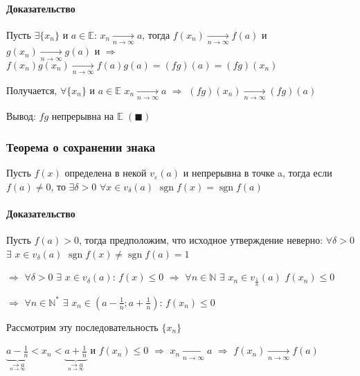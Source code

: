 \documentclass[class=article,a4paper,12pt,crop=false]{standalone}
\DeclareMathOperator{\sgn}{sgn}
\begin{document}
\paragraph{Доказательство}

Пусть $\exists \{x_n\}$ и $a \in \mathbb{E}$: $x_n \underset{n \rightarrow \infty}{\rightarrow} a$,
тогда $f(x_n) \underset{n \rightarrow \infty}{\rightarrow} f(a)$ и
$g(x_n) \underset{n \rightarrow \infty}{\rightarrow} g(a)$ и $\Rightarrow$
$f(x_n)g(x_n) \underset{n \rightarrow \infty}{ \rightarrow} f(a)g(a) = (fg)(a) = (fg)(x_n)$

Получается, $\forall \{x_n\}$ и $a \in \mathbb{E}$ $x_n \underset{n \rightarrow \infty}{ \rightarrow} a$
$\Rightarrow$ $(fg)(x_n) \underset{n \rightarrow \infty}{\rightarrow} (fg)(a)$

Вывод: $fg$ непрерывна на $\mathbb{E}$ $(\blacksquare)$

\subsubsection{Теорема о сохранении знака}

Пусть $f(x)$ определена в некой $v_{\varepsilon}(a)$ и непрерывна в точке a, тогда
если $f(a) \neq 0$, то $\exists \delta > 0$ $\forall x \in v_{\delta}(a)$
$\sgn{f(x)} = \sgn{f(a)}$

\paragraph{Доказательство} Пусть $f(a) > 0$, тогда предположим, что исходное
утверждение неверно: $\forall \delta > 0$ $\exists$ $x \in v_{\delta}(a)$
$\sgn{f(x)} \neq \sgn{f(a)} = 1$

$\Rightarrow$ $\forall \delta > 0$ $\exists$ $x \in v_{\delta}(a)$: $f(x) \leq 0$
$\Rightarrow$ $\forall n \in \mathbb{N}$ $\exists$ $x_n \in v_{\frac{1}{n}}(a)$
$f(x_n) \leq 0$

$\Rightarrow$ $\forall n \in \mathbb{N}^{*}$ $\exists$
$x_n \in (a - \frac{1}{n}; a + \frac{1}{n})$: $f(x_n) \leq 0$

Рассмотрим эту последовательность $\{x_n\}$

$\underbrace{a - \frac{1}{n}}_{\underset{n \rightarrow \infty}{\longrightarrow  a}}
< x_n < \underbrace{a + \frac{1}{n}}_{\underset{n \rightarrow \infty}{\longrightarrow  a}}$ и
$f(x_n) \leq 0$ $\Rightarrow$
$x_n \underset{n \rightarrow \infty}{\rightarrow} a$ $\Rightarrow$
$f(x_n) \underset{n \rightarrow \infty}{\rightarrow} f(a)$
\end{document}
